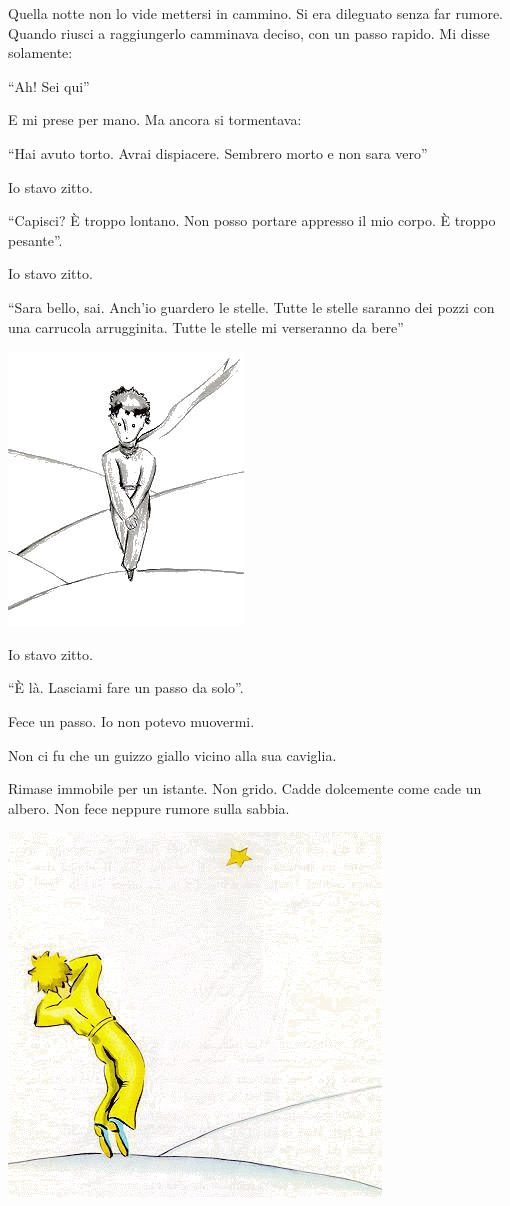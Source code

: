 \documentclass[11pt]{scrbook}
\begin{document}
Quella notte non lo vide mettersi in cammino. Si era dileguato senza far
rumore. Quando riusci a raggiungerlo camminava deciso, con un passo
rapido. Mi disse solamente:

``Ah! Sei qui''

E mi prese per mano. Ma ancora si tormentava:

``Hai avuto torto. Avrai dispiacere. Sembrero morto e non sara vero''

Io stavo zitto.

``Capisci? È troppo lontano. Non posso portare appresso il mio corpo. È
troppo pesante''.

Io stavo zitto.

``Sara bello, sai. Anch'io guardero le stelle. Tutte le stelle saranno
dei pozzi con una carrucola arrugginita. Tutte le stelle mi verseranno
da bere''

\begin{center}
\includegraphics{img/26c}
\end{center}

Io stavo zitto.

``È là. Lasciami fare un passo da solo''.

Fece un passo. Io non potevo muovermi.

Non ci fu che un guizzo giallo vicino alla sua caviglia.

Rimase immobile per un istante. Non grido. Cadde dolcemente come cade un
albero. Non fece neppure rumore sulla sabbia.

\begin{center}
\includegraphics{img/zlaty}
\end{center}
\end{document}
